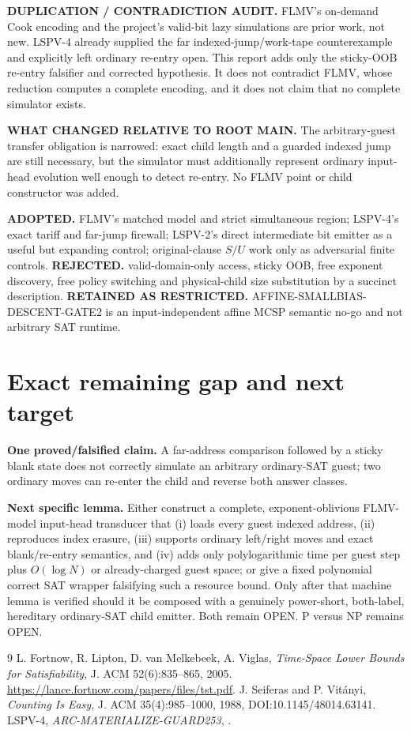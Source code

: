\documentclass[11pt]{article}
\begin{document}
\textbf{DUPLICATION / CONTRADICTION AUDIT.}  FLMV's on-demand Cook encoding
and the project's valid-bit lazy simulations are prior work, not new.  LSPV-4
already supplied the far indexed-jump/work-tape counterexample and explicitly
left ordinary re-entry open.  This report adds only the sticky-OOB re-entry
falsifier and corrected hypothesis.  It does not contradict FLMV, whose
reduction computes a complete encoding, and it does not claim that no complete
simulator exists.

\textbf{WHAT CHANGED RELATIVE TO ROOT MAIN.}  The arbitrary-guest transfer
obligation is narrowed: exact child length and a guarded indexed jump are still
necessary, but the simulator must additionally represent ordinary input-head
evolution well enough to detect re-entry.  No FLMV point or child constructor
was added.

\textbf{ADOPTED.}  FLMV's matched model and strict simultaneous region;
LSPV-4's exact tariff and far-jump firewall; LSPV-2's direct intermediate bit
emitter as a useful but expanding control; original-clause $S/U$ work only as
adversarial finite controls.  \textbf{REJECTED.}  valid-domain-only access,
sticky OOB, free exponent discovery, free policy switching and physical-child
size substitution by a succinct description.  \textbf{RETAINED AS
RESTRICTED.}  AFFINE-SMALLBIAS-DESCENT-GATE2 is an input-independent affine
MCSP semantic no-go and not arbitrary SAT runtime.

\section{Exact remaining gap and next target}
\textbf{One proved/falsified claim.}  A far-address comparison followed by a
sticky blank state does not correctly simulate an arbitrary ordinary-SAT guest;
two ordinary moves can re-enter the child and reverse both answer classes.

\textbf{Next specific lemma.}  Either construct a complete, exponent-oblivious
FLMV-model input-head transducer that (i) loads every guest indexed address,
(ii) reproduces index erasure, (iii) supports ordinary left/right moves and
exact blank/re-entry semantics, and (iv) adds only polylogarithmic time per
guest step plus $O(\log N)$ or already-charged guest space; or give a fixed
polynomial correct SAT wrapper falsifying such a resource bound.  Only after
that machine lemma is verified should it be composed with a genuinely
power-short, both-label, hereditary ordinary-SAT child emitter.  Both remain
OPEN.  P versus NP remains OPEN.

\begin{thebibliography}{9}
 L. Fortnow, R. Lipton, D. van Melkebeek, A. Viglas,
\emph{Time-Space Lower Bounds for Satisfiability}, J. ACM 52(6):835--865,
2005. \url{https://lance.fortnow.com/papers/files/tst.pdf}.
 J. Seiferas and P. Vit\'anyi, \emph{Counting Is Easy},
J. ACM 35(4):985--1000, 1988, DOI:10.1145/48014.63141.
 LSPV-4, \emph{ARC-MATERIALIZE-GUARD253},
.
\end{thebibliography}
\end{document}
